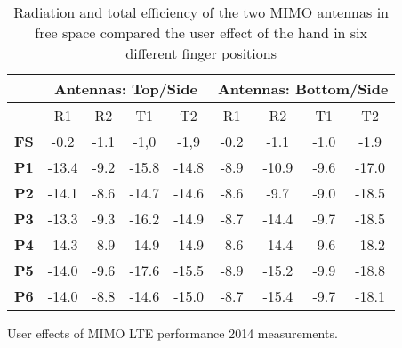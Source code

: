 \begin{table}[]
\centering
\begin{tabular}{|c|c|c|c|c|c|c|c|c|}
\hline
            & \multicolumn{4}{c|}{\textbf{Antennas: Top/Side}} & \multicolumn{4}{c|}{\textbf{Antennas: Bottom/Side}} \\ \hline
            & R1         & R2        & T1         & T2         & R1         & R2          & T1         & T2          \\ \hline
\textbf{FS} & -0.2       & -1.1      & -1,0       & -1,9       & -0.2       & -1.1        & -1.0       & -1.9        \\ \hline
\textbf{P1} & -13.4      & -9.2      & -15.8      & -14.8      & -8.9       & -10.9       & -9.6       & -17.0       \\ \hline
\textbf{P2} & -14.1      & -8.6      & -14.7      & -14.6      & -8.6       & -9.7        & -9.0       & -18.5       \\ \hline
\textbf{P3} & -13.3      & -9.3      & -16.2      & -14.9      & -8.7       & -14.4       & -9.7       & -18.5       \\ \hline
\textbf{P4} & -14.3      & -8.9      & -14.9      & -14.9      & -8.6       & -14.4       & -9.6       & -18.2       \\ \hline
\textbf{P5} & -14.0      & -9.6      & -17.6      & -15.5      & -8.9       & -15.2       & -9.9       & -18.8       \\ \hline
\textbf{P6} & -14.0      & -8.8      & -14.6      & -15.0      & -8.7       & -15.4       & -9.7       & -18.1       \\ \hline
\end{tabular}
\caption{Radiation and total efficiency of the two MIMO antennas in free space compared the user effect of the hand in six different finger positions \cite{Samantha2014UserEff}}
\label{tab:usereff_radeff}
\end{table}


User effects of MIMO LTE performance 2014 measurements. \cite{Samantha2014UserEff}
